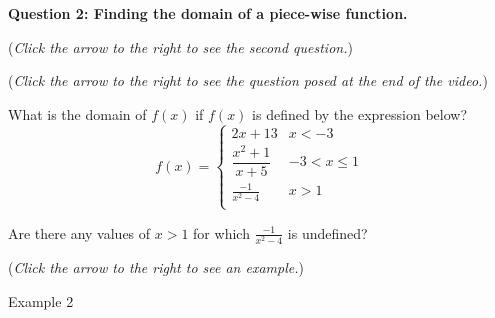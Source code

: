 \documentclass{ximera}
\begin{document}
\textbf{Question 2: Finding the domain of a piece-wise function.}
\begin{question}
\begin{flushright}
{\color{blue}(\emph{Click the arrow to the right to see the second question.})}
\end{flushright}
\begin{center}
\begin{expandable}
\begin{flushright}
{\color{blue}(\emph{Click the arrow to the right to see the  question
posed at the end of the video.})}
\end{flushright}
\begin{expandable}
What is the domain of $f(x)$ if $f(x)$ is defined by the expression below?\\

\[ f(x) = \begin{cases} 
      2x+13 & x<-3 \\
      \dfrac{x^2+1}{x+5} & -3< x\leq 1 \\
      \frac{-1}{x^2-4} & x> 1\\	
   \end{cases} \]
   
\begin{hint}

Are there any values of $x>1$ for which $\frac{-1}{x^2-4}$ is undefined?

\end{hint}

\begin{multipleChoice}
\choice{$(-\infty, -3]$}
\choice{$(-3, 1]$}
\choice{$[-3,-1]$}
\choice{$[1, \infty)$}
\choice{$(-\infty, -3) \cup (-3, 1]$}
\choice{$(-3, 1] \cup (1, \infty)$}
\choice{$(-\infty, -3) \cup (-3, 1] \cup [1, \infty)$}
\choice{$(-\infty, -3) \cup (-3, -2) \cup (-2, 1] \cup (1, 2) \cup (2, \infty)$}
\choice[correct]{$(-\infty, -3) \cup (-3, 1] \cup (1, 2) \cup (2, \infty)$}
\end{multipleChoice}
\begin{flushright}
{\color{blue}(\emph{Click the arrow to the right to see an example.})}
\end{flushright}
\begin{expandable}
Example 2
\end{expandable}
\end{expandable}
\end{expandable}
\end{center}
\end{question}
\end{document}
